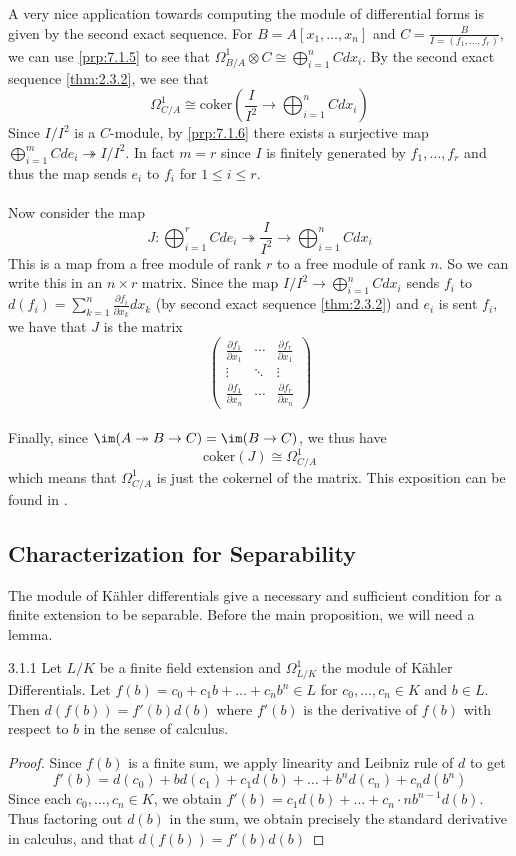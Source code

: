 \documentclass[a4paper]{article}
\begin{document}
A very nice application towards computing the module of differential forms is given by the second exact sequence. For $B=A[x_1,\dots,x_n]$ and $C=\frac{B}{I=(f_1,\dots,f_r)}$, we can use \ref{prp:7.1.5} to see that $\Omega_{B/A}^1\otimes C\cong\bigoplus_{i=1}^nCdx_i$. By the second exact sequence \ref{thm:2.3.2}, we see that $$\Omega_{C/A}^1\cong\text{coker}\left(\frac{I}{I^2}\to\bigoplus_{i=1}^nCdx_i\right)$$ Since $I/I^2$ is a $C$-module, by \ref{prp:7.1.6} there exists a surjective map $\bigoplus_{i=1}^mCde_i\twoheadrightarrow I/I^2$. In fact $m=r$ since $I$ is finitely generated by $f_1,\dots,f_r$ and thus the map sends $e_i$ to $f_i$ for $1\leq i\leq r$. \\~\\

Now consider the map $$J:\bigoplus_{i=1}^rCde_i\twoheadrightarrow\frac{I}{I^2}\rightarrow\bigoplus_{i=1}^nCdx_i$$ This is a map from a free module of rank $r$ to a free module of rank $n$. So we can write this in an $n\times r$ matrix. Since the map $I/I^2\to\bigoplus_{i=1}^nCdx_i$ sends $f_i$ to $d(f_i)=\sum_{k=1}^n\frac{\partial f_i}{\partial x_k}dx_k$ (by second exact sequence \ref{thm:2.3.2}) and $e_i$ is sent $f_i$, we have that $J$ is the matrix $$\begin{pmatrix}
\frac{\partial f_1}{\partial x_1} & \cdots & \frac{\partial f_r}{\partial x_1}\\
\vdots & \ddots & \vdots\\
\frac{\partial f_1}{\partial x_n} & \cdots & \frac{\partial f_r}{\partial x_n}
\end{pmatrix}$$~\\

Finally, since $\im(A\twoheadrightarrow B\to C)=\im(B\to C)$, we thus have $$\text{coker}(J)\cong\Omega_{C/A}^1$$ which means that $\Omega_{C/A}^1$ is just the cokernel of the matrix. This exposition can be found in \cite{Dav}. 

\subsection{Characterization for Separability}
The module of Kähler differentials give a necessary and sufficient condition for a finite extension to be separable. Before the main proposition, we will need a lemma. 

\begin{lmm}{}{3.1.1} Let $L/K$ be a finite field extension and $\Omega_{L/K}^1$ the module of Kähler Differentials. Let $f(b)=c_0+c_1b+\dots+c_nb^n\in L$ for $c_0,\dots,c_n\in K$ and $b\in L$. Then $d(f(b))=f'(b)d(b)$ where $f'(b)$ is the derivative of $f(b)$ with respect to $b$ in the sense of calculus. \tcbline
\begin{proof}
Since $f(b)$ is a finite sum, we apply linearity and Leibniz rule of $d$ to get $$f'(b)=d(c_0)+bd(c_1)+c_1d(b)+\dots+b^nd(c_n)+c_nd(b^n)$$ Since each $c_0,\dots,c_n\in K$, we obtain $f'(b)=c_1d(b)+\dots+c_n\cdot nb^{n-1}d(b)$. Thus factoring out $d(b)$ in the sum, we obtain precisely the standard derivative in calculus, and that $d(f(b))=f'(b)d(b)$
\end{proof}
\end{lmm}
\end{document}

